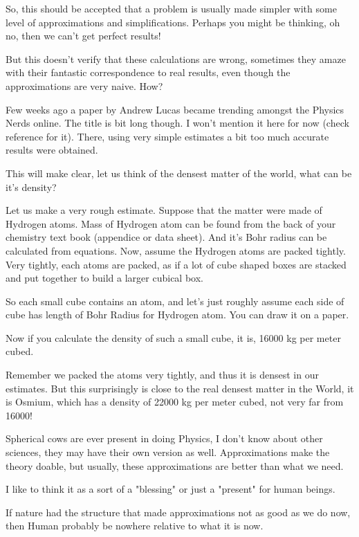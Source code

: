 \documentclass[12pt,a4paper,darkblue]{memoir}
\begin{document}
So, this should be accepted that a problem is usually made simpler with some level of approximations and simplifications. Perhaps you might be thinking, oh no, then we can't get perfect results! 

But this doesn't verify that these calculations are wrong, sometimes they amaze with their fantastic correspondence to real results, even though the approximations are very naive. How?

Few weeks ago a paper by Andrew Lucas became trending amongst the Physics Nerds online. The title is bit long though. I won't mention it here for now (check reference for it). There, using very simple estimates a bit too much accurate results were obtained. 

This will make clear, let us think of the densest matter of the world, what can be it's density? 

Let us make a very rough estimate. Suppose that the matter were made of Hydrogen atoms. Mass of Hydrogen atom can be found from the back of your chemistry text book (appendice or data sheet). And it's Bohr radius can be calculated from equations. Now, assume the Hydrogen atoms are packed tightly. Very tightly, each atoms are packed, as if a lot of cube shaped boxes are stacked and put together to build a larger cubical box. 

So each small cube contains an atom, and let's just roughly assume each side of cube has length of Bohr Radius for Hydrogen atom. You can draw it on a paper. 

Now if you calculate the density of such a small cube, it is, 16000 kg per meter cubed. 

Remember we packed the atoms very tightly, and thus it is densest in our estimates. But this surprisingly is close to the real densest matter in the World, it is Osmium, which has a density of 22000 kg per meter cubed, not very far from 16000!

Spherical cows are ever present in doing Physics, I don't know about other sciences, they may have their own version as well. Approximations make the theory doable, but usually, these approximations are better than what we need. 

I like to think it as a sort of a "blessing" or just a "present" for human beings. 

If nature had the structure that made approximations not as good as we do now, then Human probably be nowhere relative to what it is now.
\end{document}
